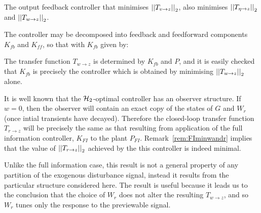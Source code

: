 \begin{cor}
\label{cor:minwandr}
The output feedback controller that minimises $\left|\left| T_{v\rightarrow z} \right|\right|_2$, also minimises $\left|\left| T_{\eta\rightarrow z} \right|\right|_2$ and $\left|\left| T_{w\rightarrow z} \right|\right|_2$.
\end{cor}
\begin{pf}
The controller may be decomposed into feedback and feedforward components $K_{fb}$ and $K_{ff}$, so that 
with $K_{fb}$ given by:

The transfer function $T_{w\rightarrow z}$ is determined by $K_{fb}$ and $P$, and it is  easily checked that $K_{fb}$ is precisely the controller which is obtained by minimising $\left|\left| T_{w\rightarrow z} \right|\right|_2$ alone.

It is well known that the $\mathcal H_2$-optimal controller has an observer structure. If $w=0$, then the observer will contain an exact copy of the states of $G$ and $W_r$ (once intial transients have decayed). Therefore the closed-loop transfer function $T_{r\rightarrow z}$ will be precisely the same as that resulting from application of the full information controller, $K_{FI}$ to the plant $P_{FI}$. Remark~\ref{rem:FIminwandr} implies that the value of $\left|\left| T_{r\rightarrow z} \right|\right|_2$ achieved by the this controller is indeed minimal.
\end{pf}

Unlike the full information case, this result is not a general property of any partition of the exogenous disturbance signal, instead it results from the particular structure considered here. The result is useful because it leads us to the conclusion that the choice of $W_r$ does not alter the resulting  $T_{w\rightarrow z}$, and so $W_r$ tunes only the response to the previewable signal. 









